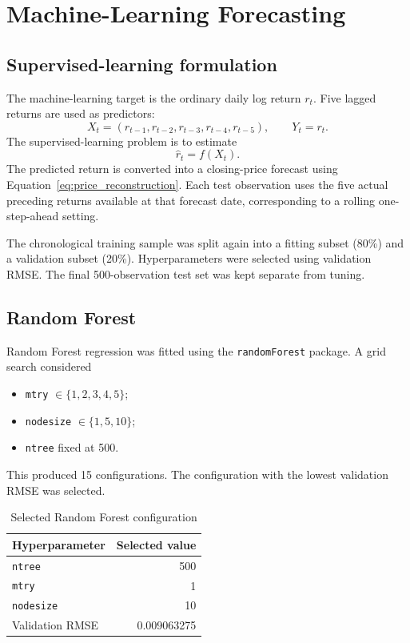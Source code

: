 \documentclass[10pt,a4paper]{article}
\begin{document}
\section{Machine-Learning Forecasting}

\subsection{Supervised-learning formulation}

The machine-learning target is the ordinary daily log return $r_t$. Five lagged returns are used as predictors:
\begin{equation}
  X_t=(r_{t-1},r_{t-2},r_{t-3},r_{t-4},r_{t-5}),
  \qquad Y_t=r_t.
  \label{eq:ml_features}
\end{equation}
The supervised-learning problem is to estimate
\begin{equation}
  \widehat r_t=f(X_t).
\end{equation}
The predicted return is converted into a closing-price forecast using Equation~\eqref{eq:price_reconstruction}. Each test observation uses the five actual preceding returns available at that forecast date, corresponding to a rolling one-step-ahead setting.

The chronological training sample was split again into a fitting subset (80\%) and a validation subset (20\%). Hyperparameters were selected using validation RMSE. The final 500-observation test set was kept separate from tuning.

\subsection{Random Forest}

Random Forest regression was fitted using the \texttt{randomForest} package. A grid search considered
\begin{itemize}[leftmargin=2em]
  \item \texttt{mtry} $\in\{1,2,3,4,5\}$;
  \item \texttt{nodesize} $\in\{1,5,10\}$;
  \item \texttt{ntree} fixed at 500.
\end{itemize}
This produced 15 configurations. The configuration with the lowest validation RMSE was selected.

\begin{table}[H]
\centering
\caption{Selected Random Forest configuration}
\begin{tabular}{lr}
\toprule
Hyperparameter & Selected value \\
\midrule
\texttt{ntree} & 500 \\
\texttt{mtry} & 1 \\
\texttt{nodesize} & 10 \\
Validation RMSE & 0.009063275 \\
\bottomrule
\end{tabular}
\label{tab:rf_tuning}
\end{table}
\end{document}
